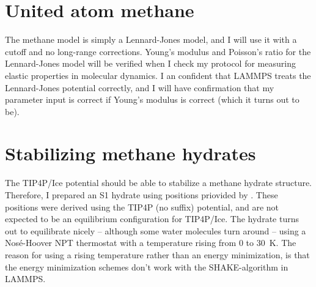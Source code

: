 \section{United atom methane}
The methane model is simply a Lennard-Jones model, and I will use it with a cutoff and no long-range corrections. Young's modulus and Poisson's ratio for the Lennard-Jones model will be verified when I check my protocol for measuring elastic properties in molecular dynamics. I an confident that LAMMPS treats the Lennard-Jones potential correctly, and I will have confirmation that my parameter input is correct if Young's modulus is correct (which it turns out to be).

\section{Stabilizing methane hydrates}
The TIP4P/Ice potential should be able to stabilize a methane hydrate structure. Therefore, I prepared an S1 hydrate using positions priovided by \citet{Takeuchi2013}. These positions were derived using the TIP4P (no suffix) potential, and are not expected to be an equilibrium configuration for TIP4P/Ice. The hydrate turns out to equilibrate nicely -- although some water molecules turn around -- using a Nosé-Hoover NPT thermostat with a temperature rising from $0$ to \SI{30}{\kelvin}. The reason for using a rising temperature rather than an energy minimization, is that the energy minimization schemes don't work with the SHAKE-algorithm in LAMMPS.

